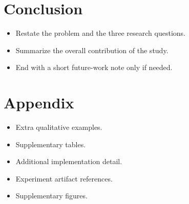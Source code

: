 \documentclass[11pt]{article}
\begin{document}
\section{Conclusion}

\begin{itemize}[leftmargin=1.5em]
    \item Restate the problem and the three research questions.
    \item Summarize the overall contribution of the study.
    \item End with a short future-work note only if needed.
\end{itemize}

\appendix

\section{Appendix}

\begin{itemize}[leftmargin=1.5em]
    \item Extra qualitative examples.
    \item Supplementary tables.
    \item Additional implementation detail.
    \item Experiment artifact references.
    \item Supplementary figures.
\end{itemize}

% 
% 
\end{document}
